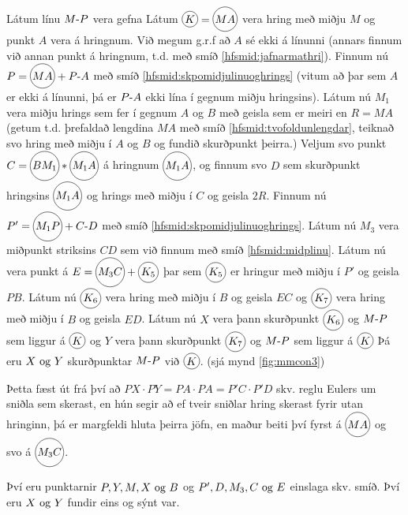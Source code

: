 \begin{frame}[allowframebreaks]
  \begin{hfsmid} \label{hfsmid:skpmidjulinuoghrings}
    Látum línu \(\lin{M}{P}\) vera gefna
    Látum \(\hri{K} = \hri{MA}\) vera hring með miðju \(M\) og punkt \(A\) vera á hringnum.
    Við megum g.r.f að \(A\) sé ekki á línunni (annars finnum við  annan punkt á hringnum, t.d. með smíð \ref{hfsmid:jafnarmathri}).
    Finnum nú \(P = \hri{MA} + \lin{P}{A}\) með smíð \ref{hfsmid:skpomidjulinuoghrings} (vitum að þar sem \(A\) er ekki á línunni,
    þá er \(\lin{P}{A}\) ekki lína í gegnum miðju hringsins).
    Látum nú \(M_1\) vera miðju hrings sem fer í gegnum \(A\) og \(B\) með geisla
    sem er meiri en \(R = MA\) (getum t.d. þrefaldað lengdina \(MA\) með smíð \ref{hfsmid:tvofoldunlengdar},
    teiknað svo hring með miðju í \(A\) og \(B\) og fundið skurðpunkt þeirra.)
    Veljum svo punkt \(C = \hri{BM_1} * \hri{M_1A}\) á hringnum \(\hri{M_1A}\), og
    finnum svo \(D\) sem skurðpunkt hringsins \(\hri{M_1A}\) og hrings með miðju í
    \(C\) og geisla \(2R\).
    \theorembreak
    Finnum nú \(P' = \hri{M_1P}+\lin{C}{D}\) með smíð \ref{hfsmid:skpomidjulinuoghrings}.
    Látum nú \(M_3\) vera miðpunkt striksins \(CD\) sem við finnum með smíð \ref{hfsmid:midplinu}.
    Látum nú vera punkt á \(E = \hri{M_3C} + \hri{K_5}\) þar sem \(\hri{K_5}\) er hringur
    með miðju í \(P'\) og geisla \(PB\).
    Látum nú \(\hri{K_6}\) vera hring með miðju í \(B\) og geisla \(EC\) og
    \(\hri{K_7}\) vera hring með miðju í \(B\) og geisla \(ED\).
    Látum nú \(X \)  vera þann skurðpunkt \(\hri{K_6}\)  og \(\lin{M}{P}\)
    sem liggur á \(\hri{K}\)
    og \(Y \)  vera þann skurðpunkt \(\hri{K_7}\)  og \(\lin{M}{P}\)
    sem liggur á \(\hri{K}\)
    Þá eru \(X \Og Y \) skurðpunktar \(\lin{M}{P}\) við \(\hri{K}\).
    (sjá mynd \ref{fig:mmcon3})

  \end{hfsmid}
\end{frame}

\begin{frame}
    Þetta fæst út frá því að \(PX \cdot PY = PA \cdot PA = P'C \cdot P'D\) skv.
    reglu Eulers um sniðla sem skerast, en hún segir að
    ef tveir sniðlar hring skerast fyrir utan hringinn, þá er margfeldi hluta
    þeirra jöfn, en maður beiti því fyrst á \(\hri{MA}\) og svo á
    \(\hri{M_3C}\).

    Því eru punktarnir \(P,Y,M,X \Og B\) og
    \(P',D,M_3, C \Og E\) einslaga skv. smíð. Því eru \(X \Og Y\) fundir eins
    og sýnt var.
\end{frame}

